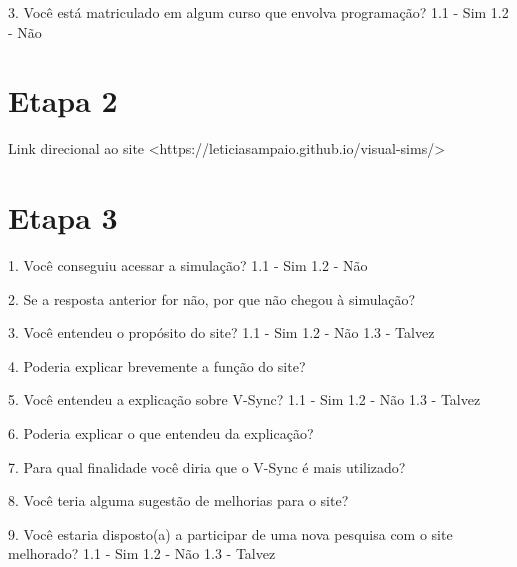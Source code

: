 \documentclass[tcc,capa]{texufpel}
\begin{document}
3. Você está matriculado em algum curso que envolva programação?
    1.1 - Sim
    1.2 - Não

\section{Etapa 2}

Link direcional ao site <https://leticiasampaio.github.io/visual-sims/>

\section{Etapa 3}

1. Você conseguiu acessar a simulação?
    1.1 - Sim
    1.2 - Não

2. Se a resposta anterior for não, por que não chegou à simulação?

3. Você entendeu o propósito do site?
    1.1 - Sim
    1.2 - Não
    1.3 - Talvez

4. Poderia explicar brevemente a função do site?

5. Você entendeu a explicação sobre V-Sync?
    1.1 - Sim
    1.2 - Não
    1.3 - Talvez

6. Poderia explicar o que entendeu da explicação?

7. Para qual finalidade você diria que o V-Sync é mais utilizado?

8. Você teria alguma sugestão de melhorias para o site?

9. Você estaria disposto(a) a participar de uma nova pesquisa com o site melhorado?
    1.1 - Sim
    1.2 - Não
    1.3 - Talvez



\end{document}
